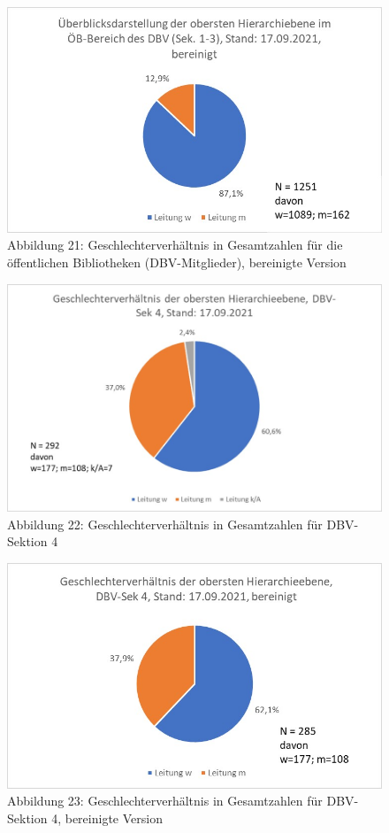 \documentclass[a4paper,
fontsize=11pt,
oneside,
numbers=noperiodatend,
parskip=half-,
bibliography=totoc,
final
]{scrartcl}
\begin{document}
\begin{figure}
\centering
\includegraphics{img/Abb_21_DBV-Sek1-3_gesamt_bereinigt.jpg}
\caption{Abbildung 21: Geschlechterverhältnis in Gesamtzahlen für die
öffentlichen Bibliotheken (DBV-Mitglieder), bereinigte Version}
\end{figure}

\begin{figure}
\centering
\includegraphics{img/Abb_22_DBV-Sek4_gesamt.jpg}
\caption{Abbildung 22: Geschlechterverhältnis in Gesamtzahlen für
DBV-Sektion 4}
\end{figure}

\begin{figure}
\centering
\includegraphics{img/Abb_23_DBV-Sek4_gesamt_bereinigt.jpg}
\caption{Abbildung 23: Geschlechterverhältnis in Gesamtzahlen für
DBV-Sektion 4, bereinigte Version}
\end{figure}
\end{document}
